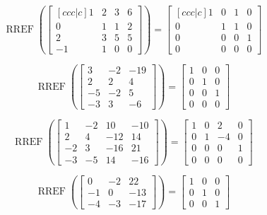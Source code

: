 \documentclass{article}
\DeclareMathOperator{\RREF}{RREF}
\begin{document}
\[\RREF\left( \begin{bmatrix}[ccc|c]
1 & 2 & 3 & 6  \\
0 & 1 & 1 & 2  \\
2 & 3 & 5 & 5 \\
-1 & 1 & 0 & 0 
\end{bmatrix} \right) 
= \begin{bmatrix}[ccc|c] 
1 & 0 & 1 & 0 \\
0 & 1 & 1 & 0 \\
0 & 0 & 0 & 1 \\
0 & 0 & 0 & 0 
\end{bmatrix}
\]



	\[\RREF\left(\left[\begin{array}{cc|c}
	 3 & -2 & -19 \\ 
	 2 & 2 &4 \\ 
	 -5 & -2 & 5 \\ 
	 -3 & 3 & -6
	 \end{array} \right] \right)= \left[ \begin{array}{cc|c} 
	 1 & 0 & 0 \\
	  0 & 1 & 0 \\ 
	  0 & 0 & 1 \\ 
	  0 & 0 & 0 
	  \end{array} \right]  \] 
	
\[\RREF\left(\left[\begin{array}{ccc|c} 
		1 & -2 & 10 & -10 \\ 
		2 & 4 & -12 & 14 \\ 
		-2 & 3 & -16 & 21 \\ 
		-3 & -5 & 14 & -16 
		\end{array} \right] \right)= 
		\left[ \begin{array}{ccc|c} 
		1 & 0 & 2 & 0 \\
		 0 & 1 & -4 & 0 \\
		  0 & 0 & 0 & 1 \\ 
		  0 & 0 & 0 & 0 
		  \end{array} \right]\]

	\[\RREF\left(\left[\begin{array}{cc|c} 
	0 & -2 & 22 \\
	 -1 & 0 & -13 \\ 
	 -4 & -3 & -17 
	 \end{array} \right] \right)= \left[ \begin{array}{cc|c} 1 & 0 & 0 \\ 0 & 1 & 0 \\ 0 & 0 & 1 \end{array} \right]  \]
	
\end{document}
